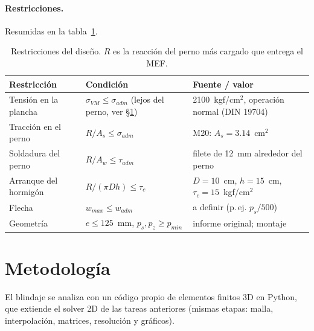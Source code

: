 \documentclass[11pt]{article}
\begin{document}
\paragraph{Restricciones.} Resumidas en la tabla~\ref{tab:restricciones}.

\begin{table}[h]
\centering
\small
\renewcommand{\arraystretch}{1.25}
\begin{tabular}{>{\raggedright}p{4.2cm} >{\raggedright}p{5.2cm} p{4.6cm}}
\toprule
\textbf{Restricci\'on} & \textbf{Condici\'on} & \textbf{Fuente / valor} \\
\midrule
Tensi\'on en la plancha & $\sigma_{VM} \le \sigma_{adm}$ (lejos del perno, ver \S\ref{sec:metodo}) &
  2100~kgf/cm$^2$, operaci\'on normal (DIN 19704) \\
Tracci\'on en el perno & $R/A_s \le \sigma_{adm}$ & M20: $A_s = 3.14$~cm$^2$ \\
Soldadura del perno & $R/A_w \le \tau_{adm}$ & filete de 12~mm alrededor del perno \\
Arranque del hormig\'on & $R/(\pi D h) \le \tau_c$ & $D = 10$~cm, $h = 15$~cm, $\tau_c = 15$~kgf/cm$^2$ \\
Flecha & $w_{max} \le w_{adm}$ & a definir (p.\,ej. $p_s/500$) \\
Geometr\'ia & $e \le 125$~mm, $p_s, p_z \ge p_{min}$ & informe original; montaje \\
\bottomrule
\end{tabular}
\caption{Restricciones del dise\~no. $R$ es la reacci\'on del perno m\'as cargado que entrega el MEF.}
\label{tab:restricciones}
\end{table}

\section{Metodolog\'ia}
\label{sec:metodo}

El blindaje se analiza con un c\'odigo propio de elementos finitos 3D en Python, que extiende el
solver 2D de las tareas anteriores (mismas etapas: malla, interpolaci\'on, matrices, resoluci\'on y
gr\'aficos).
\end{document}
